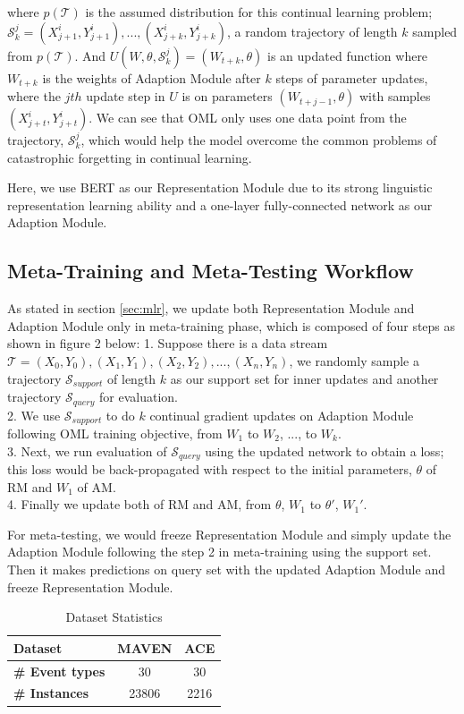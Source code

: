 where $p(\mathcal{T})$ is the assumed distribution for this continual learning problem; $\mathcal{S}_k ^ j = (X_{j+1}^i, Y_{j+1}^i), ..., (X_{j+k}^i, Y_{j+k}^i)$, a random trajectory of length $k$ sampled from $p(\mathcal{T})$. And $U(W, \theta, \mathcal{S}_k ^ j) = (W_{t+k}, \theta)$ is an updated function where $W_{t+k}$ is the weights of Adaption Module after $k$ steps of parameter updates, where the $jth$ update step in $U$ is on parameters $(W_{t+j-1}, \theta)$ with samples $(X_{j+t}^i, Y_{j+t}^i)$. We can see that OML only uses one data point from the trajectory, $\mathcal{S}_k ^ j$, which would help the model overcome the common problems of catastrophic forgetting in continual learning. 

Here, we use BERT \citep{devlin2018bert} as our Representation Module due to its strong linguistic representation learning ability and a one-layer fully-connected network as our Adaption Module. 

\subsection{Meta-Training and Meta-Testing Workflow}
As stated in section \ref{sec:mlr}, we update both Representation Module and Adaption Module only in meta-training phase, which is composed of four steps as shown in figure 2 below: 
1. Suppose there is a data stream $\mathcal{T} = (X_0, Y_0), (X_1, Y_1), (X_2, Y_2), ..., (X_n, Y_n)$, we randomly sample a trajectory $\mathcal{S}_{support}$ of length $k$ as our support set for inner updates and another trajectory $\mathcal{S}_{query}$ for evaluation. \\
2. We use $\mathcal{S}_{support}$ to do $k$ continual gradient updates on Adaption Module following OML training objective, from  $W_1$ to $W_2$, ..., to $W_k$. \\
3. Next, we run evaluation of $\mathcal{S}_{query}$ using the updated network to obtain a loss; this loss would be back-propagated with respect to the initial parameters, $\theta$ of RM and $W_1$ of AM. \\
4. Finally we update both of RM and AM, from  $\theta$, $W_1$ to $\theta'$, $W_1'$.

For meta-testing, we would freeze Representation Module and simply update the Adaption Module following the step 2 in meta-training using the support set. Then it makes predictions on query set with the updated Adaption Module and freeze Representation Module.

\begin{table}[h]
\centering
\begin{tabular}{lcc}
\hline
\textbf{Dataset} & \textbf{MAVEN} & \textbf{ACE} \\
\hline
\textbf{\# Event types}& {30} & {30} \\
\textbf{\# Instances} & {23806}& {2216} \\
\hline
\end{tabular}
\caption{Dataset Statistics}
\label{tab:stats}
\end{table}